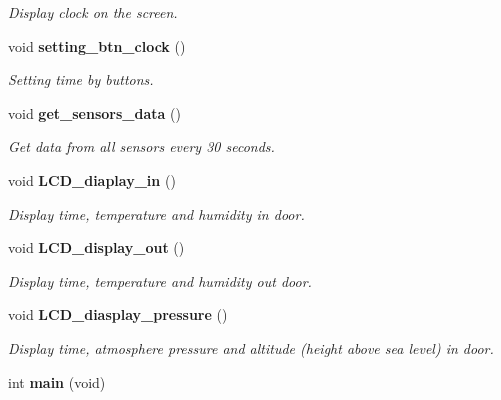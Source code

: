 \begin{DoxyCompactItemize}
\begin{DoxyCompactList}\small\item\em Display clock on the screen. \end{DoxyCompactList}\item 
void \textbf{ setting\+\_\+btn\+\_\+clock} ()
\begin{DoxyCompactList}\small\item\em Setting time by buttons. \end{DoxyCompactList}\item 
void \textbf{ get\+\_\+sensors\+\_\+data} ()
\begin{DoxyCompactList}\small\item\em Get data from all sensors every 30 seconds. \end{DoxyCompactList}\item 
void \textbf{ L\+C\+D\+\_\+diaplay\+\_\+in} ()
\begin{DoxyCompactList}\small\item\em Display time, temperature and humidity in door. \end{DoxyCompactList}\item 
void \textbf{ L\+C\+D\+\_\+display\+\_\+out} ()
\begin{DoxyCompactList}\small\item\em Display time, temperature and humidity out door. \end{DoxyCompactList}\item 
void \textbf{ L\+C\+D\+\_\+diasplay\+\_\+pressure} ()
\begin{DoxyCompactList}\small\item\em Display time, atmosphere pressure and altitude (height above sea level) in door. \end{DoxyCompactList}\item 
int \textbf{ main} (void)
\end{DoxyCompactItemize}

